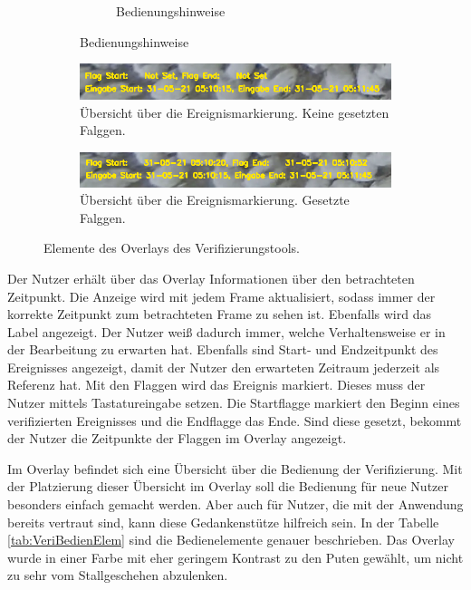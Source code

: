 \begin{figure}[hp]
\begin{subfigure}[b]{0.9\textwidth}
\begin{subfigure}[b]{0.4\textwidth}
             \caption{Bedienungshinweise}
         \end{subfigure}
     \end{subfigure}
     \begin{subfigure}[b]{0.9\textwidth}
         \centering
         \includegraphics[width=\textwidth]{img/Verifikationstool/Verifikation Video mit Maske Ereignisinfos.png}
         \caption{Übersicht über die Ereignismarkierung. Keine gesetzten Falggen.}
     \end{subfigure}
     \hfill
     \begin{subfigure}[b]{0.9\textwidth}
         \centering
         \includegraphics[width=\textwidth]{img/Verifikationstool/Verifikation Video mit Maske Ereignisinfos set.png}
         \caption{Übersicht über die Ereignismarkierung. Gesetzte Falggen.}
     \end{subfigure}
     \caption[Elemente des Overlays des Verifizierungstools.]{Elemente des Overlays des Verifizierungstools.}
     \label{fig:VerifOverlay Elem}
\end{figure}

Der Nutzer erhält über das Overlay Informationen über den betrachteten Zeitpunkt. Die Anzeige wird mit jedem Frame aktualisiert, sodass immer der korrekte Zeitpunkt zum betrachteten Frame zu sehen ist. Ebenfalls wird das Label angezeigt. Der Nutzer weiß dadurch immer, welche Verhaltensweise er in der Bearbeitung zu erwarten hat. Ebenfalls sind Start- und Endzeitpunkt des Ereignisses angezeigt, damit der Nutzer den erwarteten Zeitraum jederzeit als Referenz hat. Mit den Flaggen wird das Ereignis markiert. Dieses muss der Nutzer mittels Tastatureingabe setzen. Die Startflagge markiert den Beginn eines verifizierten Ereignisses und die Endflagge das Ende. Sind diese gesetzt, bekommt der Nutzer die Zeitpunkte der Flaggen im Overlay angezeigt. \par

Im Overlay befindet sich eine Übersicht über die Bedienung der Verifizierung. Mit der Platzierung dieser Übersicht im Overlay soll die Bedienung für neue Nutzer besonders einfach gemacht werden. Aber auch für Nutzer, die mit der Anwendung bereits vertraut sind, kann diese Gedankenstütze hilfreich sein. In der Tabelle \ref{tab:VeriBedienElem} sind die Bedienelemente genauer beschrieben. Das Overlay wurde in einer Farbe mit eher geringem Kontrast zu den Puten gewählt, um nicht zu sehr vom Stallgeschehen abzulenken. 

